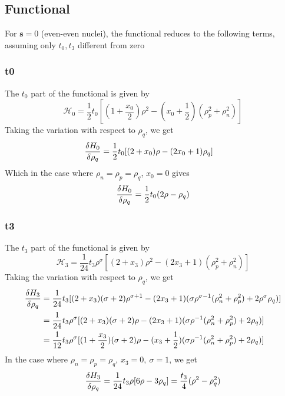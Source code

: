 \subsection{Functional}
For $\boldsymbol{s} = 0$ (even-even nuclei), the functional reduces to the following terms, assuming only $t_0, t_3$ different from zero
\subsubsection{t0}
The $t_0$ part of the functional is given by
\[\mathcal H_0 = \frac 1 2 t_0 [(1+\frac {x_0} 2)\rho^2 - (x_0 + \frac 1 2 )(\rho_p^2 + \rho_n^2)]\]
Taking the variation with respect to $\rho_q$, we get
\begin{align}
    \fdv{H_0}{\rho_q} &= \frac 1 2 t_0 [(2 + x_0)\rho - (2x_0 + 1)\rho_q]
\end{align}
Which in the case where $\rho_n = \rho_p = \rho_q$, $x_0 = 0$ gives
\[\fdv{H_0}{\rho_q} =\frac 1 2  t_0 (2 \rho - \rho_q ) \]
\subsubsection{t3}
The $t_3$ part of the functional is given by
\[\mathcal H _3 = \frac 1 {24} t_3 \rho^\sigma [(2+x_3)\rho^2 -(2x_3+1)(\rho_p^2 + \rho_n^2)]\]
Taking the variation with respect to $\rho_q$, we get
\begin{align}
    \fdv{H_3}{\rho_q} &= \frac 1 {24} t_3  [(2+x_3)(\sigma + 2)\rho^{\sigma+1} - (2x_3+1)(\sigma \rho^{\sigma-1}(\rho_n^2+\rho_p^2) +2\rho^\sigma \rho_q)]
    \\&= \frac 1 {24} t_3 \rho^\sigma [(2+x_3)(\sigma + 2)\rho - (2x_3+1)(\sigma \rho^{-1}(\rho_n^2+\rho_p^2) +2\rho_q)]
    \\&= \frac 1 {12} t_3 \rho^\sigma [(1+\frac{x_3}{2})(\sigma + 2)\rho - (x_3+\frac 1 2 )(\sigma \rho^{-1}(\rho_n^2+\rho_p^2) +2\rho_q)]
\end{align}
In the case where $\rho_n = \rho_p = \rho_q$, $x_3 = 0,\ \sigma = 1$, we get
\[\fdv{H_3}{\rho_q} = \frac 1 {24} t_3 \rho [6\rho - 3\rho_q] = \frac{t_3}{4}(\rho^2 - \rho_q^2)\] 

